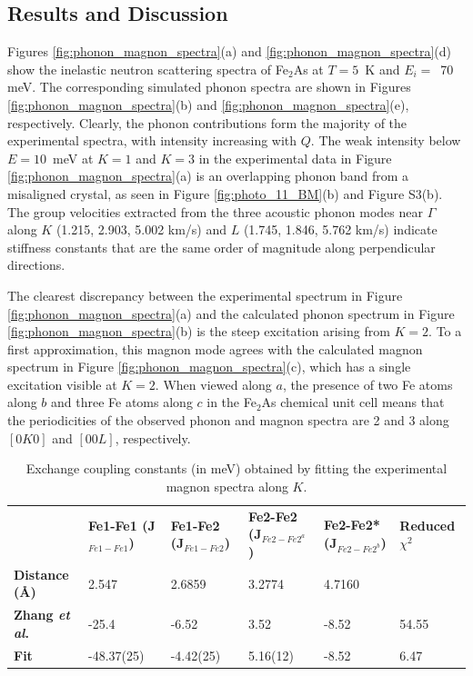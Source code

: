 \documentclass[10pt,doublespacing,edeposit]{uiucthesis2020}
\begin{document}
\begin{mainmatter}
\section{Results and Discussion}



Figures \ref{fig:phonon_magnon_spectra}(a) and \ref{fig:phonon_magnon_spectra}(d) show the inelastic neutron scattering spectra of Fe$_2$As at $T = 5$~K and $E_i =$~70 meV. The corresponding simulated phonon spectra are shown in Figures \ref{fig:phonon_magnon_spectra}(b) and \ref{fig:phonon_magnon_spectra}(e), respectively. Clearly, the phonon contributions form the majority of the experimental spectra, with intensity increasing with $Q$. 
The weak intensity below $E = 10$~meV  at $K = 1$ and $K = 3$ in the experimental data in Figure \ref{fig:phonon_magnon_spectra}(a) is an overlapping phonon band from a misaligned crystal, as seen in Figure \ref{fig:photo_11_BM}(b) and Figure S3(b).\cite{supplement} The group velocities extracted from the three acoustic phonon modes near $\Gamma$ along $K$ (1.215, 2.903, 5.002 km/s) and $L$ (1.745, 1.846, 5.762 km/s) indicate stiffness constants that are the same order of magnitude along  perpendicular directions.




The clearest discrepancy between the experimental spectrum in Figure \ref{fig:phonon_magnon_spectra}(a) and the calculated phonon spectrum in Figure \ref{fig:phonon_magnon_spectra}(b) is the steep excitation arising from $K = 2$. To a first approximation, this magnon mode agrees with the calculated magnon spectrum in Figure \ref{fig:phonon_magnon_spectra}(c), which has a single excitation visible at $K = 2$. When viewed along $a$, the presence of two Fe atoms along $b$ and three Fe atoms along $c$ in the Fe$_2$As chemical unit cell means that the periodicities of the observed phonon and magnon spectra are 2 and 3 along $[0K0]$ and $[00L]$, respectively.

\begin{table}
\caption{\label{tab:Jvalues} 
Exchange coupling constants (in meV) obtained by fitting the experimental magnon spectra along $K$. 
}
\centering
\begin{tabular}{p{3cm}p{2cm}p{2cm}p{2cm}p{2cm}p{2cm}}
\hline\hline
	&  \textbf{Fe1-Fe1 (J$_{Fe1-Fe1}$)} & \textbf{Fe1-Fe2 (J$_{Fe1-Fe2}$)} & \textbf{Fe2-Fe2 (J$_{Fe2-Fe2^a}$)} & \textbf{Fe2-Fe2* (J$_{Fe2-Fe2^b}$)} & \textbf{Reduced $\chi^2$} \\

\textbf{Distance (\AA)} & 2.547 & 2.6859 & 3.2774 & 4.7160\\
\hline\hline
\textbf{Zhang \emph{et al}.} & -25.4 & -6.52 & 3.52 & -8.52 & 54.55\\
\hline
\textbf{Fit} & -48.37(25) & -4.42(25) & 5.16(12) & -8.52 & 6.47\\
\hline\hline
\end{tabular}
~\\
\end{table}




\end{mainmatter}
\end{document}
